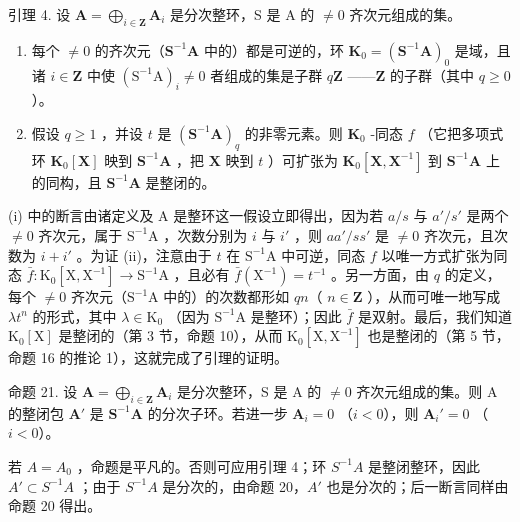 引理 4. 设 \(\mathbf{A} = \bigoplus_{i\in \mathbf{Z}}\mathbf{A}_i\) 是分次整环，S 是 A 的 \(\neq 0\) 齐次元组成的集。

\begin{enumerate}
\def\labelenumi{(\roman{enumi})}
\item
  每个 \(\neq 0\) 的齐次元（\(\mathbf{S}^{-1}\mathbf{A}\) 中的）都是可逆的，环 \(\mathbf{K}_0 = (\mathbf{S}^{-1}\mathbf{A})_0\) 是域，且诸 \(i\in \mathbf{Z}\) 中使 \((\mathrm{S}^{-1}\mathrm{A})_i\neq 0\) 者组成的集是子群 \(q\mathbf{Z}\) ——\(\mathbf{Z}\) 的子群（其中 \(q\geqslant 0\) ）。
\item
  假设 \(q \geqslant 1\) ，并设 \(t\) 是 \((\mathbf{S}^{-1}\mathbf{A})_q\) 的非零元素。则 \(\mathbf{K}_0\) -同态 \(f\) （它把多项式环 \(\mathbf{K}_0[\mathbf{X}]\) 映到 \(\mathbf{S}^{-1}\mathbf{A}\) ，把 \(\mathbf{X}\) 映到 \(t\) ）可扩张为 \(\mathbf{K}_0[\mathbf{X}, \mathbf{X}^{-1}]\) 到 \(\mathbf{S}^{-1}\mathbf{A}\) 上的同构，且 \(\mathbf{S}^{-1}\mathbf{A}\) 是整闭的。
\end{enumerate}

(i) 中的断言由诸定义及 A 是整环这一假设立即得出，因为若 \(a/s\) 与 \(a'/s'\) 是两个 \(\neq 0\) 齐次元，属于 \(\mathrm{S}^{-1}\mathrm{A}\) ，次数分别为 \(i\) 与 \(i'\) ，则 \(aa'/ss'\) 是 \(\neq 0\) 齐次元，且次数为 \(i+i'\) 。为证 (ii)，注意由于 \(t\) 在 \(\mathrm{S}^{-1}\mathrm{A}\) 中可逆，同态 \(f\) 以唯一方式扩张为同态 \(\bar{f}: \mathrm{K}_0[\mathrm{X}, \mathrm{X}^{-1}] \to \mathrm{S}^{-1}\mathrm{A}\) ，且必有 \(\bar{f}(\mathrm{X}^{-1}) = t^{-1}\) 。另一方面，由 \(q\) 的定义，每个 \(\neq 0\) 齐次元（\(\mathrm{S}^{-1}\mathrm{A}\) 中的）的次数都形如 \(qn\)（ \(n \in \mathbf{Z}\) ），从而可唯一地写成 \(\lambda t^n\) 的形式，其中 \(\lambda \in \mathrm{K}_0\) （因为 \(\mathrm{S}^{-1}\mathrm{A}\) 是整环）；因此 \(\bar{f}\) 是双射。最后，我们知道 \(\mathrm{K}_0[\mathrm{X}]\) 是整闭的（第 3 节，命题 10），从而 \(\mathrm{K}_0[\mathrm{X}, \mathrm{X}^{-1}]\) 也是整闭的（第 5 节，命题 16 的推论 1），这就完成了引理的证明。

命题 21. 设 \(\mathbf{A} = \bigoplus_{i\in \mathbf{Z}}\mathbf{A}_i\) 是分次整环，S 是 A 的 \(\neq 0\) 齐次元组成的集。则 A 的整闭包 \(\mathbf{A}'\) 是 \(\mathbf{S}^{-1}\mathbf{A}\) 的分次子环。若进一步 \(\mathbf{A}_i = 0\) （\(i < 0\)），则 \(\mathbf{A}_i' = 0\) （\(i < 0\)）。

若 \(A = A_{0}\) ，命题是平凡的。否则可应用引理 4；环 \(S^{-1}A\) 是整闭整环，因此 \(A' \subset S^{-1}A\) ；由于 \(S^{-1}A\) 是分次的，由命题 20，\(A'\) 也是分次的；后一断言同样由命题 20 得出。


